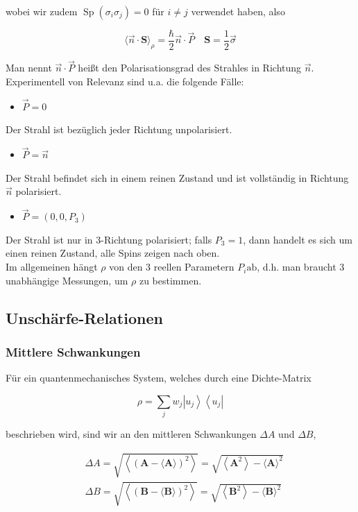 \documentclass[10pt, letterpaper]{article}
\begin{document}
wobei wir zudem $\operatorname{Sp}\left(\sigma_{i} \sigma_{j}\right)=0$ für $i \neq j$ verwendet haben, also

$$
\langle\vec{n} \cdot \mathbf{S}\rangle_{\rho}=\frac{\hbar}{2} \vec{n} \cdot \vec{P} \quad \mathbf{S}=\frac{1}{2} \vec{\sigma}
$$

Man nennt $\vec{n} \cdot \vec{P}$ heißt den Polarisationsgrad des Strahles in Richtung $\vec{n}$. Experimentell von Relevanz sind u.a. die folgende Fälle:

\begin{itemize}
  \item $\vec{P}=0$
\end{itemize}

Der Strahl ist bezüglich jeder Richtung unpolarisiert.

\begin{itemize}
  \item $\vec{P}=\vec{n}$
\end{itemize}

Der Strahl befindet sich in einem reinen Zustand und ist vollständig in Richtung $\vec{n}$ polarisiert.

\begin{itemize}
  \item $\vec{P}=\left(0,0, P_{3}\right)$
\end{itemize}

Der Strahl ist nur in 3-Richtung polarisiert; falls $P_{3}=1$, dann handelt es sich um einen reinen Zustand, alle Spins zeigen nach oben.\\
Im allgemeinen hängt $\rho$ von den 3 reellen Parametern $P_{i} \mathrm{ab}$, d.h. man braucht 3 unabhängige Messungen, um $\rho$ zu bestimmen.

\subsection*{Unschärfe-Relationen}
\subsubsection*{Mittlere Schwankungen}
Für ein quantenmechanisches System, welches durch eine Dichte-Matrix

$$
\rho=\sum_{j} w_{j}\left|u_{j}\right\rangle\left\langle u_{j}\right|
$$

beschrieben wird, sind wir an den mittleren Schwankungen $\Delta A$ und $\Delta B$,

$$
\begin{aligned}
& \Delta A=\sqrt{\left\langle(\mathbf{A}-\langle\mathbf{A}\rangle)^{2}\right\rangle}=\sqrt{\left\langle\mathbf{A}^{2}\right\rangle-\langle\mathbf{A}\rangle^{2}} \\
& \Delta B=\sqrt{\left\langle(\mathbf{B}-\langle\mathbf{B}\rangle)^{2}\right\rangle}=\sqrt{\left\langle\mathbf{B}^{2}\right\rangle-\langle\mathbf{B}\rangle^{2}}
\end{aligned}
$$
\end{document}
